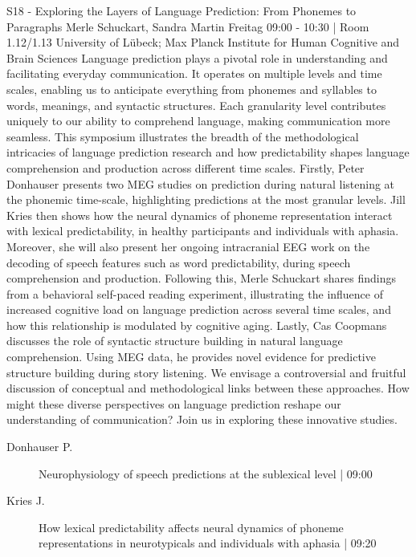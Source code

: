 
            \begin{symposium}
            {S18 - Exploring the Layers of Language Prediction: From Phonemes to Paragraphs}
            {Merle Schuckart, Sandra Martin}
            {Freitag 09:00 - 10:30 | Room 1.12/1.13}
            {University of Lübeck; Max Planck Institute for Human Cognitive and Brain Sciences}
            Language prediction plays a pivotal role in understanding and facilitating everyday communication. It operates on multiple levels and time scales, enabling us to anticipate everything from phonemes and syllables to words, meanings, and syntactic structures. Each granularity level contributes uniquely to our ability to comprehend language, making communication more seamless. This symposium illustrates the breadth of the methodological intricacies of language prediction research and how predictability shapes language comprehension and production across different time scales.
Firstly, Peter Donhauser presents two MEG studies on prediction during natural listening at the phonemic time-scale, highlighting predictions at the most granular levels. Jill Kries then shows how the neural dynamics of phoneme representation interact with lexical predictability, in healthy participants and individuals with aphasia. Moreover, she will also present her ongoing intracranial EEG work on the decoding of speech features such as word predictability, during speech comprehension and production. Following this, Merle Schuckart shares findings from a behavioral self-paced reading experiment, illustrating the influence of increased cognitive load on language prediction across several time scales, and how this relationship is modulated by cognitive aging. Lastly, Cas Coopmans discusses the role of syntactic structure building in natural language comprehension. Using MEG data, he provides novel evidence for predictive structure building during story listening.
We envisage a controversial and fruitful discussion of conceptual and methodological links between these approaches. How might these diverse perspectives on language prediction reshape our understanding of communication? Join us in exploring these innovative studies.
            \begin{description}    
            
                \item [ Donhauser P.] Neurophysiology of speech predictions at the sublexical level \textcolor{mygray}{ | 09:00}    
                
                \item [ Kries J.] How lexical predictability affects neural dynamics of phoneme representations in neurotypicals and individuals with aphasia \textcolor{mygray}{ | 09:20}    
                

\end{description}
\end{symposium}
